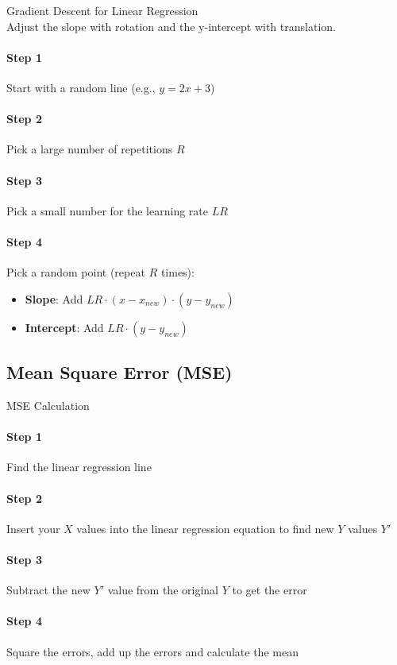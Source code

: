 \begin{KR}{Gradient Descent for Linear Regression}\\
Adjust the slope with rotation and the y-intercept with translation.

\paragraph{Step 1}
Start with a random line (e.g., $y = 2x + 3$)

\paragraph{Step 2}
Pick a large number of repetitions $R$

\paragraph{Step 3}
Pick a small number for the learning rate $LR$

\paragraph{Step 4}
Pick a random point (repeat $R$ times):
\begin{itemize}
    \item \textbf{Slope}: Add $LR \cdot (x - x_{new}) \cdot (y - y_{new})$
    \item \textbf{Intercept}: Add $LR \cdot (y - y_{new})$
\end{itemize}
\end{KR}


\subsection{Mean Square Error (MSE)}

\begin{KR}{MSE Calculation}\\
\paragraph{Step 1}
Find the linear regression line

\paragraph{Step 2}
Insert your $X$ values into the linear regression equation to find new $Y$ values $Y'$

\paragraph{Step 3}
Subtract the new $Y'$ value from the original $Y$ to get the error

\paragraph{Step 4}
Square the errors, add up the errors and calculate the mean
\end{KR}

